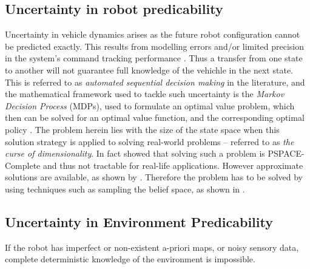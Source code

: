 \subsection{Uncertainty in robot predicability}
Uncertainty in vehicle dynamics arises as the future robot configuration cannot
be predicted exactly. This results from modelling errors and/or limited
precision in the system's command tracking performance
\cite{dadkhah_survey_2012}. Thus a transfer from one state to another will not
guarantee full knowledge of the vehichle in the next state. This is referred to
as \textit{automated sequential decision making} in the literature, and the
mathematical framework used to tackle such uncertainty is the \textit{Markov
  Decision Process} (MDPs), used to formulate an optimal value problem, which
then can be solved for an optimal value function, and the corresponding optimal
policy \cite{Cassandra:1998:EAA:926710}. The problem herein lies with the size
of the state space when this solution strategy is applied to solving real-world
problems -- referred to as \textit{the curse of dimensionality}. In fact
\cite[Tsilkis]{christos_h._papadimitriou_complexity_1987} showed that solving
such a problem is PSPACE-Complete and thus not tractable for real-life
applications. However approximate solutions are available, as shown by
\cite[Kaelbling et. al]{kaelbling_planning_1998}. Therefore the problem has to
be solved by using techniques such as sampling the belief space, as shown in
\cite[Kearns et. al]{kearns_sparse}.


\subsection{Uncertainty in Environment Predicability}
If the robot has imperfect or non-existent a-priori maps, or noisy sensory data,
complete deterministic knowledge of the environment is impossible.

